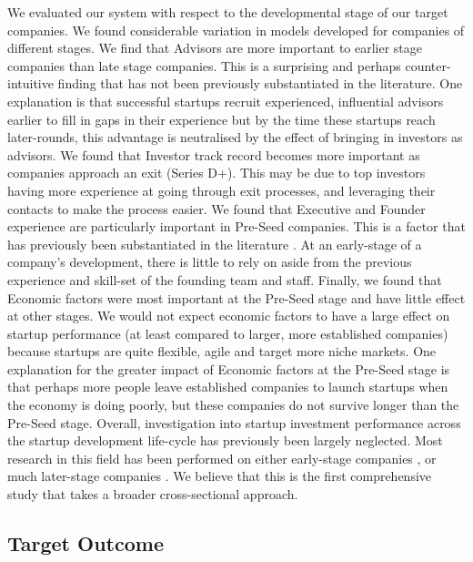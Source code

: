 \documentclass[../thesis/thesis.tex]{subfiles}
\begin{document}
We evaluated our system with respect to the developmental stage of our target companies. We found considerable variation in models developed for companies of different stages. We find that Advisors are more important to earlier stage companies than late stage companies. This is a surprising and perhaps counter-intuitive finding that has not been previously substantiated in the literature. One explanation is that successful startups recruit experienced, influential advisors earlier to fill in gaps in their experience but by the time these startups reach later-rounds, this advantage is neutralised by the effect of bringing in investors as advisors. We found that Investor track record becomes more important as companies approach an exit (Series D+). This may be due to top investors having more experience at going through exit processes, and leveraging their contacts to make the process easier. We found that Executive and Founder experience are particularly important in Pre-Seed companies. This is a factor that has previously been substantiated in the literature \cite{beckwith2016,an2015}. At an early-stage of a company's development, there is little to rely on aside from the previous experience and skill-set of the founding team and staff. Finally, we found that Economic factors were most important at the Pre-Seed stage and have little effect at other stages. We would not expect economic factors to have a large effect on startup performance (at least compared to larger, more established companies) because startups are quite flexible, agile and target more niche markets. One explanation for the greater impact of Economic factors at the Pre-Seed stage is that perhaps more people leave established companies to launch startups when the economy is doing poorly, but these companies do not survive longer than the Pre-Seed stage. Overall, investigation into startup investment performance across the startup development life-cycle has previously been largely neglected. Most research in this field has been performed on either early-stage companies \cite{beckwiwth2016,stone2014,yuan2016,ahlers2015}, or much later-stage companies \cite{bhat2011}. We believe that this is the first comprehensive study that takes a broader cross-sectional approach.

\subsection{Target Outcome}
\end{document}
